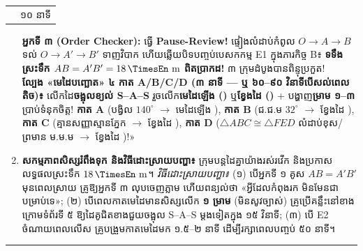 \documentclass[a4paper,12pt]{article}
\makeatletter
\newcommand{\en}[1]{{\TimesEn #1}}
\newcommand{\enbf}[1]{{\TimesEn\textbf{#1}}}
\newcommand{\unit}[1]{\,\text{\en{#1}}}
\newcommand{\cnum}[1]{{\fontsize{10.5pt}{12pt}\selectfont\ding{\numexpr181+#1\relax}}}
\newcommand{\tri}[1]{\ensuremath{\triangle #1}}
\newcommand{\cg}{\ensuremath{\cong}}
\newenvironment{phasebox}[3]{%
  \needspace{2.2cm}%
  \begin{tcolorbox}[
    enhanced, sharp corners, colback=headgray, colframe=black,
    boxrule=1.0pt, top=4pt, bottom=4pt, left=9pt, right=9pt,
    before skip=7pt, after skip=3pt
  ]%
    \renewcommand{\arraystretch}{1.0}%
    \begin{tabular*}{\linewidth}{@{}>{\raggedright\arraybackslash}p{13.60cm}@{\extracolsep{\fill}}r@{}}
      {\muol\fontsize{11pt}{17.5pt}\selectfont #1} & {\fontsize{10.5pt}{15pt}\selectfont\en{#2 |} #3}%
    \end{tabular*}%
  \end{tcolorbox}%
  \begingroup\fontsize{11.5pt}{18.2pt}\selectfont
}{%
  \par\endgroup\vspace{3pt}\hrule height 0.5pt\vspace{5pt}%
}
\makeatother
\begin{document}
\begin{phasebox}{ជំហានទី ៤ \enbf{(}ខ\enbf{)} \enbf{--- E5 Evaluate}៖ ប្រលង \enbf{Relay Proof Race} ៣ តួនាទី \enbf{\&} \enbf{«}មេដៃបញ្ឆោត\enbf{»} ៤ កាត}{38--48 min}{១០ នាទី}
\begin{enumerate}[leftmargin=0.45cm, topsep=2pt, itemsep=4pt, parsep=0pt]
\begin{scriptbox}
        \textbf{អ្នកទី ៣ (\en{Order Checker}):} ធ្វើ \textbf{\en{Pause-Review!}} ផ្ទៀងលំដាប់កំពូល $O\to A\to B$ ទល់ $O\to A'\to B'$ ទាញវិបាក \cnum{5} ហើយឆ្លើយបិទបញ្ចប់បេសកកម្ម \en{E1} ក្នុងភារកិច្ច \en{B}៖ \textbf{ទទឹងស្រះទឹក $AB = A'B' = 18\unit{m}$ ពិតប្រាកដ!} ៣ ក្រុមដំបូងបានពិន្ទុប្រកួត!\\
        \textbf{ល្បែង «មេដៃបញ្ឆោត» ៤ កាត \en{A/B/C/D} (៣ នាទី — ឬ ៦០--៩០ វិនាទីបើសល់ពេលតិច)៖} លើកដៃ\textbf{ចង្អុលខ្យល់ \en{S--A--S}} រួចលើក\textbf{មេដៃឡើង ()} ឬ\textbf{ខ្វែងដៃ ()} + បង្ហាញ\textbf{ម្រាម ១--៣} ប្រាប់ទំនុកចិត្ត! \textbf{កាត \en{A}} (បង្វិល $140^\circ$ $\to$ មេដៃឡើង ), \textbf{កាត \en{B}} (ជ.ជ.ម $32^\circ$ $\to$ ខ្វែងដៃ ), \textbf{កាត \en{C}} (គ្មានសញ្ញាស្មានភ្នែក $\to$ ខ្វែងដៃ ), \textbf{កាត \en{D}} ($\tri{ABC}\cg\tri{FED}$ លំដាប់ខុស/ព្រមាន ម.ម.ម $\to$ ខ្វែងដៃ )!»
      \end{scriptbox}
    \item \textbf{សកម្មភាពសិស្សរំពឹងទុក និងវិធីដោះស្រាយបញ្ហា៖} ក្រុមបន្តដៃគ្នាយ៉ាងរស់រវើក និងប្រកាសលទ្ធផលស្រះទឹក $18\unit{m}$។ \textit{វិធីដោះស្រាយបញ្ហា៖} (១) បើអ្នកទី ១ គូស $AB = A'B'$ មុនពេលស្រាយ គ្រូឱ្យអ្នកទី ៣ លុបចេញភ្លាម ហើយពន្យល់ថា «អ្វីដែលកំពុងរក មិនមែនជាបម្រាប់ទេ»; (២) បើពេលកាតមេដៃមានសិស្សលើក \textbf{១ ម្រាម} (មិនសូវច្បាស់) គ្រូប្រើគន្លឹះនៅខាងក្រោមទំព័រទី ៥ ឱ្យដៃគូជិតខាងជួយចង្អុល \en{S--A--S} ម្ដងទៀតក្នុង ១៥ វិនាទី; (៣) បើ \en{E2} ចំណាយពេលលើស គ្រូបង្រួមកាតមេដៃមក ១.៥--២ នាទី ដើម្បីរក្សាពេលបញ្ចប់ ៥០ នាទី។
  \end{enumerate}
\end{phasebox}
\end{document}
